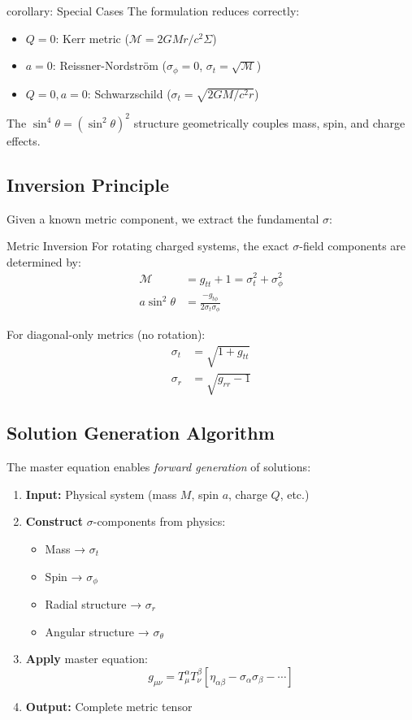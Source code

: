 \documentclass[11pt,a4paper]{article}
\theoremstyle{definition}
\theoremstyle{remark}
\begin{document}
	corollary: Special Cases
		The formulation reduces correctly:
		\begin{itemize}
			\item $Q=0$: Kerr metric ($\mathcal{M} = 2GMr/c^2\Sigma$)
			\item $a=0$: Reissner-Nordström ($\sigma_\phi = 0$, $\sigma_t = \sqrt{\mathcal{M}}$)
			\item $Q=0, a=0$: Schwarzschild ($\sigma_t = \sqrt{2GM/c^2r}$)
		\end{itemize}
	
	The $\sin^4\theta = (\sin^2\theta)^2$ structure geometrically couples mass, spin, and charge effects.
	
	\subsection{Inversion Principle}
	
	Given a known metric component, we extract the fundamental $\sigma$:
	
	Metric Inversion
		For rotating charged systems, the exact $\sigma$-field components are determined by:
		\begin{align}
			\mathcal{M} &= g_{tt} + 1 = \sigma_t^2 + \sigma_\phi^2\\
			a\sin^2\theta &= \frac{-g_{t\phi}}{2\sigma_t\sigma_\phi}
		\end{align}
		
		For diagonal-only metrics (no rotation):
		\begin{align}
			\sigma_t &= \sqrt{1 + g_{tt}}\\
			\sigma_r &= \sqrt{g_{rr} - 1}
		\end{align}
	
	\subsection{Solution Generation Algorithm}
	
	The master equation enables \emph{forward generation} of solutions:
	
	\begin{enumerate}
		\item \textbf{Input:} Physical system (mass $M$, spin $a$, charge $Q$, etc.)
		\item \textbf{Construct} $\sigma$-components from physics:
		\begin{itemize}
			\item Mass → $\sigma_t$
			\item Spin → $\sigma_\phi$
			\item Radial structure → $\sigma_r$
			\item Angular structure → $\sigma_\theta$
		\end{itemize}
		\item \textbf{Apply} master equation:
		\begin{equation}
			g_{\mu\nu} = T^\alpha_\mu T^\beta_\nu[\eta_{\alpha\beta} - \sigma_\alpha\sigma_\beta - \cdots]
		\end{equation}
		\item \textbf{Output:} Complete metric tensor
	\end{enumerate}
	
\end{document}
